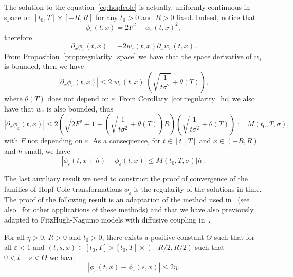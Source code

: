 \documentclass[onefignum,onetabnum]{siamart190516}
\newcommand{\1}{\mathbbm{1}}
\newcommand{\eps}{\varepsilon}
\begin{document}
\begin{remark}
\label{rem:unifcont}
The solution to the equation~\eqref{eq:hopfcole} is actually, uniformly continuous in space on $[t_0,T]\times[-R,R]$ for any $t_0>0$ and $R>0$ fixed. Indeed, notice that
$$
\phi_\eps(t,x)=2F^2-w_\eps(t,x)^2,
$$
therefore
$$
\partial_x\phi_\eps(t,x) = -2w_\eps(t,x)\partial_xw_\eps(t,x).
$$
From Proposition~\ref{prop:regularity_space} we have that the space derivative of $w_\eps$ is bounded, then we have
$$
|\partial_x\phi_\eps(t,x) | \leq 2|w_\eps(t,x)|\left(\sqrt{\frac{1}{t\sigma^2}}+\theta(T)\right),
$$
where $\theta(T)$ does not depend on $\eps$. From Corollary~\ref{cor:regularity_hc} we also have that $w_\eps$ is also bounded, thus
$$
|\partial_x\phi_\eps(t,x) | \leq 2\left(\sqrt{2F^2+1}+\left(\sqrt{\frac{1}{t\sigma^2}}+\theta(T)\right)R\right)\left(\sqrt{\frac{1}{t\sigma^2}}+\theta(T)\right):=M(t_0,T,\sigma),
$$
with $F$ not depending on $\eps$. As a consequence, for $t\in[t_0,T]$ and $x\in(-R,R)$ and $h$ small, we have
$$
|\phi_\eps(t,x+h)-\phi_\eps(t,x)|\leq M(t_0,T,\sigma)|h|.
$$
\end{remark}

The last auxiliary result we need to construct the proof of convergence of the families of Hopf-Cole transformations $\phi_\eps$ is the regularity of the solutions in time. The proof of the following result is an adaptation of the method used in~\cite[Lemma 9.1]{barles2002geometrical} (see also~\cite{perthame2008dirac,barles2009concentration} for other applications of these methods) and that we have also previously adapted to FitzHugh-Nagumo models with diffusive coupling in~\cite{quininao2020clamping}. 

\begin{lemma}
\label{lem:regularity_time}
For all $\eta>0$, $R>0$ and $t_0>0$, there exists a positive constant $\Theta$ such that for all $\eps<1$ and $(t,s,x)\in[t_0,T]\times [t_0,T]\times (-R/2,R/2)$ such that $0<t-s<\Theta$ we have
$$
|\phi_\eps(t,x)-\phi_\eps(s,x)|\leq 2\eta.
$$
\end{lemma}
\end{document}
